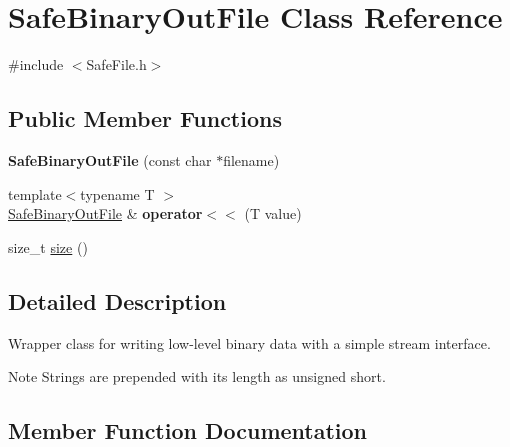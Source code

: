 \hypertarget{classSafeBinaryOutFile}{}\section{Safe\+Binary\+Out\+File Class Reference}
\label{classSafeBinaryOutFile}


{\ttfamily \#include $<$Safe\+File.\+h$>$}

\subsection*{Public Member Functions}
\begin{DoxyCompactItemize}
\item 
\mbox{\label{classSafeBinaryOutFile_a57cee06f3c5bc897b74ccf5d0b72e53c}} 
{\bfseries Safe\+Binary\+Out\+File} (const char $\ast$filename)
\item 
\mbox{\label{classSafeBinaryOutFile_a9e37616d205bb174a86e16933c47a31a}} 
{\footnotesize template$<$typename T $>$ }\\\mbox{\hyperlink{classSafeBinaryOutFile}{Safe\+Binary\+Out\+File}} \& {\bfseries operator$<$$<$} (T value)
\item 
size\+\_\+t \mbox{\hyperlink{classSafeBinaryOutFile_a6c75cb4cbb2438d0f4abad8021f1baa5}{size}} ()
\end{DoxyCompactItemize}


\subsection{Detailed Description}
Wrapper class for writing low-\/level binary data with a simple stream interface.

\begin{DoxyNote}{Note}
Strings are prepended with its length as unsigned short. 
\end{DoxyNote}


\subsection{Member Function Documentation}
\mbox{\label{classSafeBinaryOutFile_a6c75cb4cbb2438d0f4abad8021f1baa5}} 
